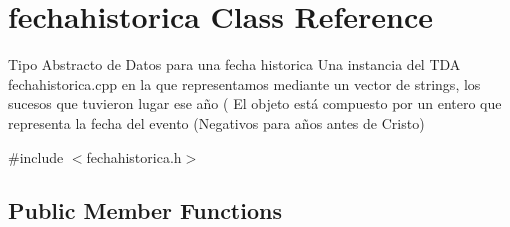 \hypertarget{classfechahistorica}{}\section{fechahistorica Class Reference}
\label{classfechahistorica}


Tipo Abstracto de Datos para una fecha historica Una instancia del T\+DA fechahistorica.\+cpp en la que representamos mediante un vector de strings, los sucesos que tuvieron lugar ese año ( El objeto está compuesto por un entero que representa la fecha del evento (Negativos para años antes de Cristo)  




{\ttfamily \#include $<$fechahistorica.\+h$>$}

\subsection*{Public Member Functions}
